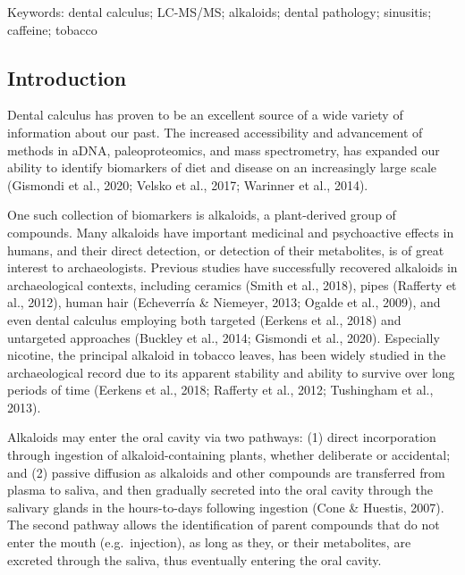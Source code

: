 \documentclass[
]{article}
\begin{document}
Keywords:  dental calculus; LC-MS/MS; alkaloids; dental pathology;
sinusitis; caffeine; tobacco 
\ifdefined\Shaded\renewenvironment{Shaded}{\begin{tcolorbox}[borderline west={3pt}{0pt}{shadecolor}, interior hidden, enhanced, boxrule=0pt, sharp corners, breakable, frame hidden]}{\end{tcolorbox}}\fi

\hypertarget{introduction}{%
\subsection{Introduction}\label{introduction}}

Dental calculus has proven to be an excellent source of a wide variety
of information about our past. The increased accessibility and
advancement of methods in aDNA, paleoproteomics, and mass spectrometry,
has expanded our ability to identify biomarkers of diet and disease on
an increasingly large scale (Gismondi et al., 2020; Velsko et al., 2017;
Warinner et al., 2014).

One such collection of biomarkers is alkaloids, a plant-derived group of
compounds. Many alkaloids have important medicinal and psychoactive
effects in humans, and their direct detection, or detection of their
metabolites, is of great interest to archaeologists. Previous studies
have successfully recovered alkaloids in archaeological contexts,
including ceramics (Smith et al., 2018), pipes (Rafferty et al., 2012),
human hair (Echeverría \& Niemeyer, 2013; Ogalde et al., 2009), and even
dental calculus employing both targeted (Eerkens et al., 2018) and
untargeted approaches (Buckley et al., 2014; Gismondi et al., 2020).
Especially nicotine, the principal alkaloid in tobacco leaves, has been
widely studied in the archaeological record due to its apparent
stability and ability to survive over long periods of time (Eerkens et
al., 2018; Rafferty et al., 2012; Tushingham et al., 2013).

Alkaloids may enter the oral cavity via two pathways: (1) direct
incorporation through ingestion of alkaloid-containing plants, whether
deliberate or accidental; and (2) passive diffusion as alkaloids and
other compounds are transferred from plasma to saliva, and then
gradually secreted into the oral cavity through the salivary glands in
the hours-to-days following ingestion (Cone \& Huestis, 2007). The
second pathway allows the identification of parent compounds that do not
enter the mouth (e.g.~injection), as long as they, or their metabolites,
are excreted through the saliva, thus eventually entering the oral
cavity.
\end{document}
